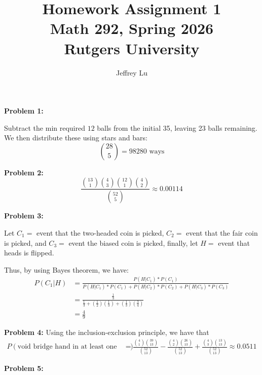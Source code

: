 \documentclass[12pt]{article}
\title{Homework Assignment 1 \\ \large Math 292, Spring 2026 \\ Rutgers University}
\author{Jeffrey Lu}
\begin{document}
\maketitle

\noindent \textbf{Problem 1:}

Subtract the min required $12$ balls from the initial 35, leaving 23 balls remaining.
We then distribute these using stars and bars:
\[
    \binom{28}{5} = 98280 \text{ ways}
\]

\noindent \textbf{Problem 2:}
\[
    \frac{\binom{13}{1} \binom{4}{3}  \binom{12}{1} \binom{4}{2}}{\binom{52}{5}} \approx{0.00114}
\]

\noindent \textbf{Problem 3:}

Let $C_1 = $ event that the two-headed coin is picked,
$C_2= $ event that the fair coin is picked,
and $C_3= $ event the biased coin is picked,
finally, let $H =$ event that heads is flipped.

Thus, by using Bayes theorem, we have:
\begin{align*}
    P(C_1|H) & = \frac{P(H|C_1)*P(C_1)}{P(H|C_1)*P(C_1) + P(H|C_2)*P(C_2) + P(H|C_3)*P(C_3)}                \\
             & = \frac{\frac{1}{3}}{\frac{1}{3} + (\frac{1}{2}) (\frac{1}{3}) + (\frac{1}{3})(\frac{3}{4})} \\
             & = \tfrac{4}{9}
\end{align*}



\noindent \textbf{Problem 4:}
Using the inclusion-exclusion principle, we have that
\begin{align*}
    P(\text{void bridge hand in at least one suit}) & = \frac{\binom{4}{1} \binom{39}{13}}{\binom{52}{13}} - \frac{\binom{4}{2} \binom{26}{13}}{\binom{52}{13}} + \frac{\binom{4}{3} \binom{13}{13}}{\binom{52}{13}} \approx{0.0511}
\end{align*}



\noindent \textbf{Problem 5:}
\end{document}
